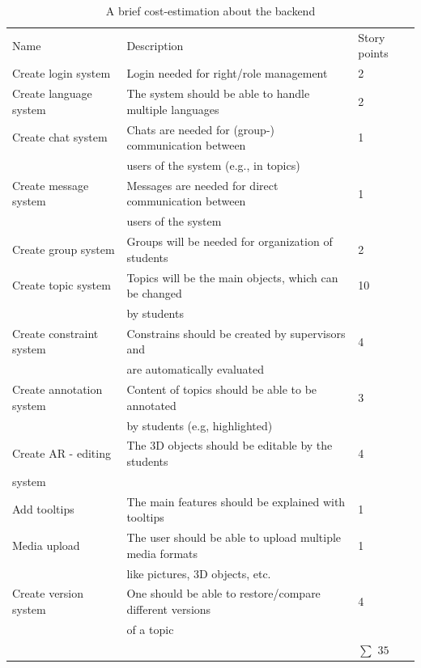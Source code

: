 \begin{table}[h]
\scriptsize
 \caption{A brief cost-estimation about the backend}
 \begin{tabular}{lll}
	\toprule
  Name & Description & Story points \\ 
\cmidrule(rl){1-1}\cmidrule(rl){2-2}\cmidrule(rl){3-3}
	Create login system		&	Login needed for right/role management			&	2 \\	
	Create language system	&	The system should be able to handle multiple languages&	2 \\	
	Create chat system		&	Chats are needed for (group-) communication between &	1 \\	
		 				&	users of the system (e.g., in topics)					&	 \\	
	Create message system &	Messages are needed for direct communication between&	1 \\
	 					&	users of the system 							&	 \\		
  	Create group system 	& 	Groups will be needed for organization of students 	& 	2 \\
  	Create topic system 	& 	Topics will be the main objects, which can be changed  	& 	10 \\
  	 					& 	by students  								 	&	   \\
	Create constraint system  &	Constrains should be created by supervisors and 		&	4 \\
						&	are automatically evaluated						&	   \\	
  	Create annotation system & 	Content of topics should be able to be annotated  		& 	3 \\
  	 					& 	by students  (e.g, highlighted)						&	   \\
  	Create \ac{AR} - editing  & 	The 3D objects should be editable by the students 	& 	4 \\
  	 system				& 												&	   \\
	Add tooltips			&	The main features should be explained with tooltips	&	1 \\
	Media upload			&	The user should be able to upload multiple media formats	&	1 \\
	  	 				& 	like pictures, 3D objects, etc.						&	   \\
	Create version system	&	One should be able to restore/compare different versions &	4 \\	
		  	 			& 	of a topic										&	   \\
				  	 	& 												& $\sum$ $35$   \\
	\bottomrule
 \end{tabular}
 \label{tab:costBackend}
 \end{table} 

